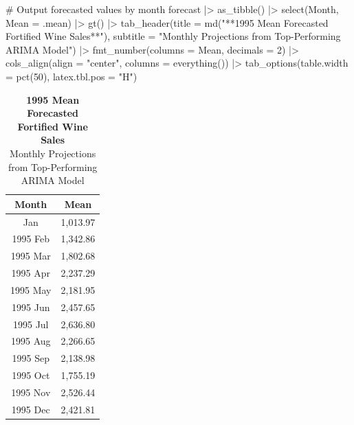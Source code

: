 \documentclass[
  letterpaper,
  DIV=11,
  numbers=noendperiod]{scrartcl}
\newenvironment{Shaded}{\begin{snugshade}}{\end{snugshade}}
\newcommand{\AttributeTok}[1]{\textcolor[rgb]{0.40,0.45,0.13}{#1}}
\newcommand{\CommentTok}[1]{\textcolor[rgb]{0.37,0.37,0.37}{#1}}
\newcommand{\DecValTok}[1]{\textcolor[rgb]{0.68,0.00,0.00}{#1}}
\newcommand{\FunctionTok}[1]{\textcolor[rgb]{0.28,0.35,0.67}{#1}}
\newcommand{\NormalTok}[1]{\textcolor[rgb]{0.00,0.23,0.31}{#1}}
\newcommand{\SpecialCharTok}[1]{\textcolor[rgb]{0.37,0.37,0.37}{#1}}
\newcommand{\StringTok}[1]{\textcolor[rgb]{0.13,0.47,0.30}{#1}}
\begin{document}
\begin{Shaded}
\begin{Highlighting}[]
\CommentTok{\# Output forecasted values by month}
\NormalTok{forecast }\SpecialCharTok{|\textgreater{}}
  \FunctionTok{as\_tibble}\NormalTok{() }\SpecialCharTok{|\textgreater{}}
  \FunctionTok{select}\NormalTok{(Month, }\AttributeTok{Mean =}\NormalTok{ .mean) }\SpecialCharTok{|\textgreater{}}
  \FunctionTok{gt}\NormalTok{() }\SpecialCharTok{|\textgreater{}}
  \FunctionTok{tab\_header}\NormalTok{(}\AttributeTok{title =} \FunctionTok{md}\NormalTok{(}\StringTok{"**1995 Mean Forecasted Fortified Wine Sales**"}\NormalTok{),}
    \AttributeTok{subtitle =} \StringTok{"Monthly Projections from Top{-}Performing ARIMA Model"}\NormalTok{) }\SpecialCharTok{|\textgreater{}}
  \FunctionTok{fmt\_number}\NormalTok{(}\AttributeTok{columns =}\NormalTok{ Mean, }\AttributeTok{decimals =} \DecValTok{2}\NormalTok{) }\SpecialCharTok{|\textgreater{}}
  \FunctionTok{cols\_align}\NormalTok{(}\AttributeTok{align =} \StringTok{"center"}\NormalTok{, }\AttributeTok{columns =} \FunctionTok{everything}\NormalTok{()) }\SpecialCharTok{|\textgreater{}}
  \FunctionTok{tab\_options}\NormalTok{(}\AttributeTok{table.width =} \FunctionTok{pct}\NormalTok{(}\DecValTok{50}\NormalTok{), }\AttributeTok{latex.tbl.pos =} \StringTok{"H"}\NormalTok{)}
\end{Highlighting}
\end{Shaded}

\begin{table}
\caption*{
{\fontsize{20}{25}\selectfont  \textbf{1995 Mean Forecasted Fortified Wine Sales}\fontsize{12}{15}\selectfont } \\ 
{\fontsize{14}{17}\selectfont  Monthly Projections from Top-Performing ARIMA Model\fontsize{12}{15}\selectfont }
} 
\fontsize{12.0pt}{14.0pt}\selectfont
\begin{tabular*}{0.5\linewidth}{@{\extracolsep{\fill}}cc}
\toprule
Month & Mean \\ 
\midrule\addlinespace[2.5pt]
1995 Jan & 1,013.97 \\ 
1995 Feb & 1,342.86 \\ 
1995 Mar & 1,802.68 \\ 
1995 Apr & 2,237.29 \\ 
1995 May & 2,181.95 \\ 
1995 Jun & 2,457.65 \\ 
1995 Jul & 2,636.80 \\ 
1995 Aug & 2,266.65 \\ 
1995 Sep & 2,138.98 \\ 
1995 Oct & 1,755.19 \\ 
1995 Nov & 2,526.44 \\ 
1995 Dec & 2,421.81 \\ 
\bottomrule
\end{tabular*}
\end{table}
\end{document}

